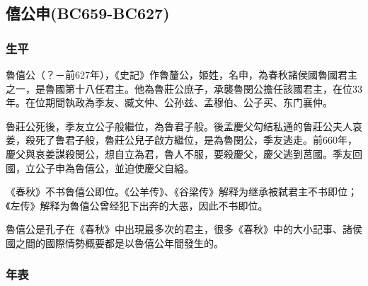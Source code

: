 
\subsection{僖公申{\tiny(BC659-BC627)}}

\subsubsection{生平}

魯僖公（？－前627年），《史記》作魯釐公，姬姓，名申，為春秋諸侯國魯國君主之一，是魯國第十八任君主。他為魯莊公庶子，承襲魯閔公擔任該國君主，在位33年。在位期間執政為季友、臧文仲、公孙兹、孟穆伯、公子买、东门襄仲。

魯莊公死後，季友立公子般繼位，為魯君子般。後孟慶父勾结私通的鲁莊公夫人哀姜，殺死了鲁君子般，魯莊公兒子啟方繼位，是為魯閔公，季友逃走。前660年，慶父與哀姜謀殺閔公，想自立為君，魯人不服，要殺慶父，慶父逃到莒國。季友回國，立公子申為魯僖公，並迫使慶父自縊。

《春秋》不书魯僖公即位。《公羊传》、《谷梁传》解释为继承被弑君主不书即位；《左传》解释为魯僖公曾经犯下出奔的大恶，因此不书即位。

魯僖公是孔子在《春秋》中出現最多次的君主，很多《春秋》中的大小記事、諸侯國之間的國際情勢概要都是以魯僖公年間發生的。

\subsubsection{年表}

